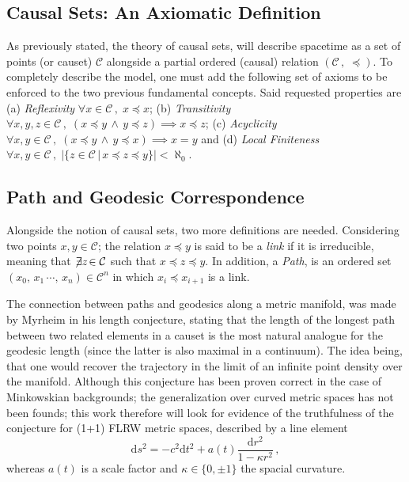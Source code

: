 \documentclass[%
 reprint,
 amsmath,amssymb,
 aps,
]{revtex4-2}
\begin{document}
\subsection{Causal Sets: An Axiomatic Definition}
As previously stated, the theory of causal sets, will describe spacetime as a set of points (or causet) $\mathcal{C}$ alongside a partial ordered (causal) relation $(\mathcal{C}\,,\;\preceq)$. To completely describe the model, one must add the following set of axioms to be enforced to the two previous fundamental concepts. Said requested properties are (a) \textit{Reflexivity} $\forall x\in\mathcal{C}\,,\; x\preceq x$; (b) \textit{Transitivity} $\forall x,y,z\in\mathcal{C}\,,\;(x\preceq y\,\land\,y\preceq z)\implies x\preceq z$; (c) \textit{Acyclicity} $\forall x,y\in\mathcal{C}\,,\;(x\preceq y\,\land\,y\preceq x)\implies x=y$ and (d) \textit{Local Finiteness} $\forall x,y\in\mathcal{C}\,,\; |\{z\in\mathcal{C}\,|\, x\preceq z\preceq y\}|< \aleph_0$.


\subsection{Path and Geodesic Correspondence}
Alongside the notion of causal sets, two more definitions are needed. Considering two points $x,y\in\mathcal{C}$; the relation $x\preceq y$ is said to be a  \textit{link} if it is irreducible, meaning that $\not\!\exists z\!\in\mathcal{C}$ such that $x\preceq z\preceq y$. In addition, a \textit{Path}, is an ordered set $(x_0,\,x_1\,\cdots,\,x_n)\in\mathcal{C}^n$ in which  $x_i\preceq x_{i+1}$ is a link.

The connection between paths and geodesics along a metric manifold, was made by Myrheim \cite{Conjecture} in his length conjecture, stating that the length of the longest path between two related elements in a causet is the most natural analogue for the geodesic length (since the latter is also maximal in a continuum). The idea being, that one would recover the trajectory in the limit of an infinite point density over the manifold.  Although this conjecture has been proven correct \cite{FlatProof} in the case of Minkowskian backgrounds; the generalization over curved metric spaces has not been founds; this work therefore will look for evidence of the truthfulness of the conjecture for (1+1) FLRW metric spaces, described by a line element
\begin{equation}\label{eq: FLRW}
    \text{d}s^2=-c^2\text{d}t^2+a(t)\frac{\text{d}r^2}{1-\kappa r^2}\,,
\end{equation}
whereas $a(t)$ is a scale factor and $\kappa\in\{0,\pm 1\}$ the spacial curvature.
\end{document}
